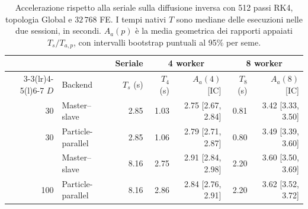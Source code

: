 \begin{table}[!t]
\centering\small
\caption{Accelerazione rispetto alla seriale sulla diffusione inversa con 512 passi RK4, topologia Global e $32\,768$ FE. I tempi nativi $T$ sono mediane delle esecuzioni nelle due sessioni, in secondi. $A_a(p)$ è la media geometrica dei rapporti appaiati $T_s/T_{a,p}$, con intervalli bootstrap puntuali al 95\% per seme.}
\label{tab:inverse-serial-speedup}
\begin{tabular}{@{}r l r rr rr@{}}
\toprule
 & & Seriale & \multicolumn{2}{c}{4 worker} & \multicolumn{2}{c}{8 worker} \\
\cmidrule(lr){3-3}\cmidrule(lr){4-5}\cmidrule(l){6-7}
$D$ & Backend & $T_s$ (s) & $T_4$ (s) & $A_a(4)$ [IC] & $T_8$ (s) & $A_a(8)$ [IC] \\
\midrule
30 & Master--slave & 2.85 & 1.03 & 2.75 [2.67, 2.84] & 0.81 & 3.42 [3.33, 3.50] \\
30 & Particle-parallel & 2.85 & 1.06 & 2.79 [2.71, 2.87] & 0.80 & 3.49 [3.39, 3.60] \\
\addlinespace
100 & Master--slave & 8.16 & 2.75 & 2.91 [2.84, 2.98] & 2.20 & 3.60 [3.50, 3.69] \\
100 & Particle-parallel & 8.16 & 2.86 & 2.84 [2.76, 2.91] & 2.20 & 3.62 [3.52, 3.72] \\
\bottomrule
\end{tabular}
\end{table}
